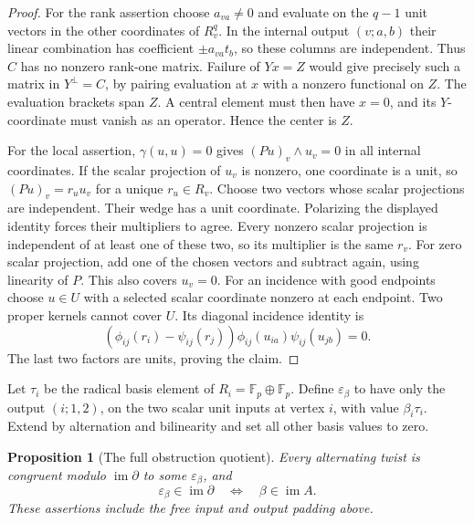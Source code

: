 \documentclass[11pt]{article}
\newcommand{\F}{\mathbb F_p}
\DeclareMathOperator{\im}{im}
\newtheorem{proposition}[theorem]{Proposition}
\theoremstyle{definition}
\theoremstyle{remark}
\numberwithin{equation}{section}
\begin{document}
\begin{proof}
For the rank assertion choose $a_{va}\ne0$ and evaluate on the $q-1$
unit vectors in the other coordinates of $R_v^q$.  In the internal
output $(v;a,b)$ their linear combination has coefficient
$\pm a_{va}t_b$, so these columns are independent.  Thus $C$ has no
nonzero rank-one matrix.  Failure of $Yx=Z$ would give precisely such a
matrix in $Y^\perp=C$, by pairing evaluation at $x$ with a nonzero
functional on $Z$.  The evaluation brackets span $Z$.
A central element must then have $x=0$, and its
$Y$-coordinate must vanish as an operator. Hence the center is $Z$.

For the local assertion, $\gamma(u,u)=0$ gives
$(Pu)_v\wedge u_v=0$ in all internal coordinates.  If the scalar
projection of $u_v$ is nonzero, one coordinate is a unit, so
$(Pu)_v=r_u u_v$ for a unique $r_u\in R_v$.  Choose two vectors whose
scalar projections are independent.  Their wedge has a unit coordinate.
Polarizing the displayed identity forces their multipliers to agree.
Every nonzero scalar projection is independent of at least one of these
two, so its multiplier is the same $r_v$.  For zero scalar projection,
add one of the chosen vectors and subtract again, using linearity of $P$.
This also covers $u_v=0$.
For an incidence with good endpoints choose $u\in U$ with a selected
scalar coordinate nonzero at each endpoint. Two proper kernels cannot
cover $U$.  Its diagonal incidence identity is
\[
 (\phi_{ij}(r_i)-\psi_{ij}(r_j))
       \phi_{ij}(u_{ia})\psi_{ij}(u_{jb})=0.
\]
The last two factors are units, proving the claim.
\end{proof}

Let $\tau_i$ be the radical basis element of $R_i=\F\oplus\F$.
Define $\varepsilon_\beta$ to have only the output $(i;1,2)$, on the
two scalar unit inputs at vertex $i$, with value $\beta_i\tau_i$.
Extend by alternation and bilinearity and set all other basis values to zero.

\begin{proposition}[The full obstruction quotient]
\label{hyb:cokernel}
Every alternating twist is congruent modulo $\im\partial$ to some
$\varepsilon_\beta$, and
\[
 \varepsilon_\beta\in\im\partial
       \quad\Longleftrightarrow\quad \beta\in\im A.
\]
These assertions include the free input and output padding above.
\end{proposition}
\end{document}
